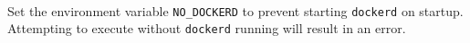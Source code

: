 

\noindent\\Set the environment variable \texttt{NO\_DOCKERD} to prevent starting \texttt{dockerd} 
on startup. Attempting to execute \scaresolver without \texttt{dockerd} running will result 
in an error.

